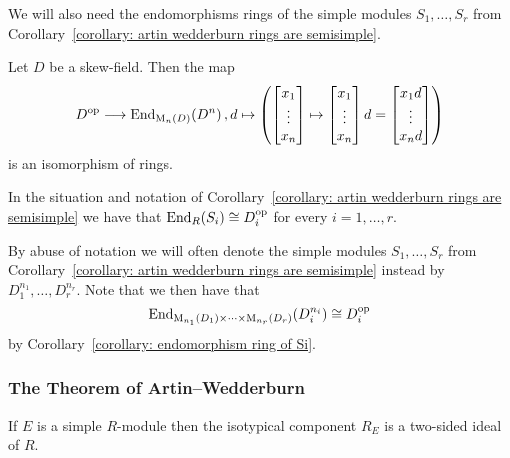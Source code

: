 \begin{fluff}
  We will also need the endomorphisms rings of the simple modules $S_1, \dotsc, S_r$ from Corollary~\ref{corollary: artin wedderburn rings are semisimple}.
\end{fluff}


\begin{lemma}
  \label{lemma: matrix vector space correspondence for skew fields}
  Let $D$ be a skew-field.
  Then the map
  \[
            D^{\mathrm{op}}
    \longrightarrow \operatorname{End}_{\operatorname{M}_n(D)}(D^n) \,,
            d
    \mapsto \left(
                      \begin{bmatrix}x_1 \\ \vdots \\ x_n\end{bmatrix}
              \mapsto \begin{bmatrix}x_1 \\ \vdots \\ x_n\end{bmatrix} d
              =       \begin{bmatrix}x_1 d \\ \vdots \\ x_n d\end{bmatrix}
            \right)
  \]
  is an isomorphism of rings.
\end{lemma}


\begin{corollary}
  \label{corollary: endomorphism ring of Si}
  In the situation and notation of Corollary~\ref{corollary: artin wedderburn rings are semisimple} we have that $\operatorname{End}_R(S_i) \cong D_i^{\mathrm{op}}$ for every $i = 1, \dotsc, r$.
\end{corollary}


\begin{notation}
  \label{notation: simple modules over products of matrix rings}
  By abuse of notation we will often denote the simple modules $S_1, \dotsc, S_r$ from Corollary~\ref{corollary: artin wedderburn rings are semisimple} instead by $D_1^{n_1}, \dotsc, D_r^{n_r}$.
  Note that we then have that
  \[
          \operatorname{End}_{\operatorname{M}_{n_1}(D_1) \times \dotsb \times \operatorname{M}_{n_r}(D_r)}(D_i^{n_i})
    \cong D_i^{\mathrm{op}}
  \]
  by Corollary~\ref{corollary: endomorphism ring of Si}.
\end{notation}







\subsubsection{The Theorem of Artin--Wedderburn}


\begin{lemma}
  \label{lemma: isotypical components are two sided ideals}
  If $E$ is a simple $R$-module then the isotypical component $R_E$ is a two-sided ideal of $R$.
\end{lemma}


